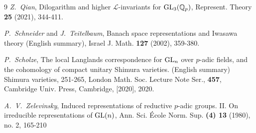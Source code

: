 \documentclass[SecEq,CM,GP]{degruyter-crelle} %
\theoremstyle{plain}
\newcommand{\GLN}{{\rm GL}}
\newcommand{\BQ}{{\mathbb{Q}}}
\begin{document}
\begin{thebibliography}{9}
\textit{Z.~Qian}, 
Dilogarithm and higher {$\mathcal{L}$}-invariants for {${\GLN}_3({\BQ}_p)$}, Represent. Theory \textbf{25} (2021), 344-411.

\textit{P.~Schneider} and \textit{J.~Teitelbaum},  
Banach space representations and Iwasawa theory (English summary), Israel J. Math. \textbf{127} (2002), 359-380.


\textit{P.~Scholze},
The local Langlands correspondence for $\GLN_{n}$ over $p$-adic fields, and the cohomology of compact unitary Shimura varieties. (English summary) Shimura varieties, 251-265, London Math. Soc. Lecture Note Ser., \textbf{457}, Cambridge Univ. Press, Cambridge, [2020], 2020. 

\textit{A.~V.~Zelevinsky},
Induced representations of reductive $p$-adic groups. II. On irreducible representations of $\GLN(n)$,  Ann. Sci. \'{E}cole Norm. Sup. \textbf{(4) 13} (1980), no. 2, 165-210




\end{thebibliography}
\end{document}
